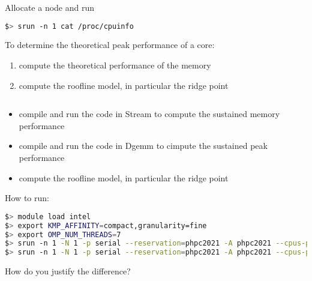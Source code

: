 \documentclass[11pt,a4paper]{article}
\begin{document}

\noindent

\begin{exercise}
  $~$ %

Allocate a node and run
\begin{lstlisting}[language=bash]
$> srun -n 1 cat /proc/cpuinfo
\end{lstlisting}

To determine the theoretical peak performance of a core:

\begin{enumerate}
\item compute the theoretical performance of the memory
\item compute the roofline model, in particular the ridge point
\end{enumerate}

\end{exercise}

\begin{exercise}
  $~$ %

\begin{itemize}
\item compile and run the code in Stream to compute the sustained memory performance
\item compile and run the code in Dgemm to cimpute the sustained peak performance 
\item compute the roofline model, in particular the ridge point
\end{itemize}

How to run:

\begin{lstlisting}[language=bash,basicstyle=\tiny]
$> module load intel
$> export KMP_AFFINITY=compact,granularity=fine
$> export OMP_NUM_THREADS=7
$> srun -n 1 -N 1 -p serial --reservation=phpc2021 -A phpc2021 --cpus-per-task $OMP_NUM_THREADS ./stream
$> srun -n 1 -N 1 -p serial --reservation=phpc2021 -A phpc2021 --cpus-per-task $OMP_NUM_THREADS ./dgemm
\end{lstlisting}

How do you justify the difference?

\end{exercise}
\end{document}
